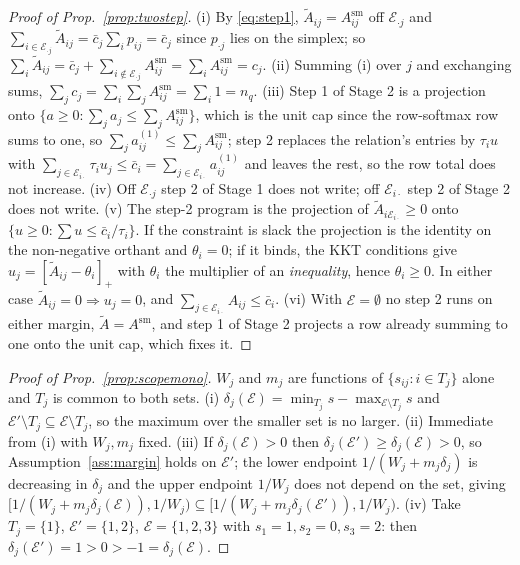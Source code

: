 \documentclass{article}
\begin{document}
\begin{proof}[Proof of Prop.~\ref{prop:twostep}]
(i) By \eqref{eq:step1}, $\tilde A_{ij}=A^{\mathrm{sm}}_{ij}$ off $\mathcal{E}_{\cdot j}$ and
$\sum_{i\in\mathcal{E}_{\cdot j}}\tilde A_{ij}=\bar c_j\sum_i p_{ij}=\bar c_j$ since $p_{\cdot j}$ lies
on the simplex; so $\sum_i\tilde A_{ij}=\bar c_j+\sum_{i\notin\mathcal{E}_{\cdot j}}A^{\mathrm{sm}}_{ij}
=\sum_iA^{\mathrm{sm}}_{ij}=c_j$. (ii) Summing (i) over $j$ and exchanging sums,
$\sum_jc_j=\sum_i\sum_jA^{\mathrm{sm}}_{ij}=\sum_i1=n_q$. (iii) Step 1 of Stage 2 is a
projection onto $\{a\ge0:\sum_ja_j\le\sum_jA^{\mathrm{sm}}_{ij}\}$, which is the unit cap since
the row-softmax row sums to one, so $\sum_ja^{(1)}_{ij}\le\sum_jA^{\mathrm{sm}}_{ij}$; step 2 replaces the
relation's entries by $\tau_iu$ with $\sum_{j\in\mathcal{E}_{i\cdot}}\tau_iu_j\le \bar c_i
=\sum_{j\in\mathcal{E}_{i\cdot}}a^{(1)}_{ij}$ and leaves the rest, so the row total does not
increase. (iv) Off $\mathcal{E}_{\cdot j}$ step 2 of Stage 1 does not write; off
$\mathcal{E}_{i\cdot}$ step 2 of Stage 2 does not write. (v) The step-2 program is the projection
of $\tilde A_{i\mathcal{E}_{i\cdot}}\ge0$ onto $\{u\ge0:\sum u\le \bar c_i/\tau_i\}$. If the
constraint is slack the projection is the identity on the non-negative orthant and
$\theta_i=0$; if it binds, the KKT conditions give $u_j=[\tilde A_{ij}-\theta_i]_+$ with
$\theta_i$ the multiplier of an \emph{inequality}, hence $\theta_i\ge0$. In either case
$\tilde A_{ij}=0\Rightarrow u_j=0$, and $\sum_{j\in\mathcal{E}_{i\cdot}}A_{ij}\le \bar c_i$. (vi) With
$\mathcal{E}=\emptyset$ no step 2 runs on either margin, $\tilde A=A^{\mathrm{sm}}$, and step 1 of
Stage 2 projects a row already summing to one onto the unit cap, which fixes it.
\end{proof}

\begin{proof}[Proof of Prop.~\ref{prop:scopemono}]
$W_j$ and $m_j$ are functions of $\{s_{ij}:i\in T_j\}$ alone and $T_j$ is common to both sets.
(i) $\delta_j(\mathcal{E})=\min_{T_j}s-\max_{\mathcal{E}\setminus T_j}s$ and
$\mathcal{E}'\setminus T_j\subseteq\mathcal{E}\setminus T_j$, so the maximum over the smaller
set is no larger. (ii) Immediate from (i) with $W_j,m_j$ fixed. (iii) If
$\delta_j(\mathcal{E})>0$ then $\delta_j(\mathcal{E}')\ge\delta_j(\mathcal{E})>0$, so
Assumption~\ref{ass:margin} holds on $\mathcal{E}'$; the lower endpoint $1/(W_j+m_j\delta_j)$ is
decreasing in $\delta_j$ and the upper endpoint $1/W_j$ does not depend on the set, giving
$[1/(W_j+m_j\delta_j(\mathcal{E})),1/W_j)\subseteq[1/(W_j+m_j\delta_j(\mathcal{E}')),1/W_j)$.
(iv) Take $T_j=\{1\}$, $\mathcal{E}'=\{1,2\}$, $\mathcal{E}=\{1,2,3\}$ with
$s_1=1,s_2=0,s_3=2$: then $\delta_j(\mathcal{E}')=1>0>-1=\delta_j(\mathcal{E})$.
\end{proof}
\end{document}
